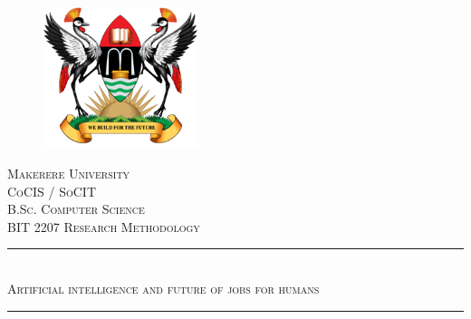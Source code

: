 \documentclass[12pt, a4paper]{report}
\begin{document}
\begin{titlepage}

\newcommand{\HRule}{\rule{\linewidth}{0.1mm}} %

\center %


\begin{figure}
    \centering
  \includegraphics[width=0.4\textwidth]{muklogo.png}
\end{figure}
 

\textsc{\LARGE Makerere University}\\[0.7cm] %
\textsc{\Large CoCIS / SoCIT}\\[0.2cm] %
\textsc{\large B.Sc. Computer Science}\\[0.1cm] %
\textsc{\small BIT 2207 Research Methodology}\\[0.8cm]


\HRule \\[0.6cm]
\textsc{\Large Artificial intelligence and future of jobs for humans}\\[0.6cm]
\HRule \\[1.0cm]
 


\end{titlepage}
\end{document}

